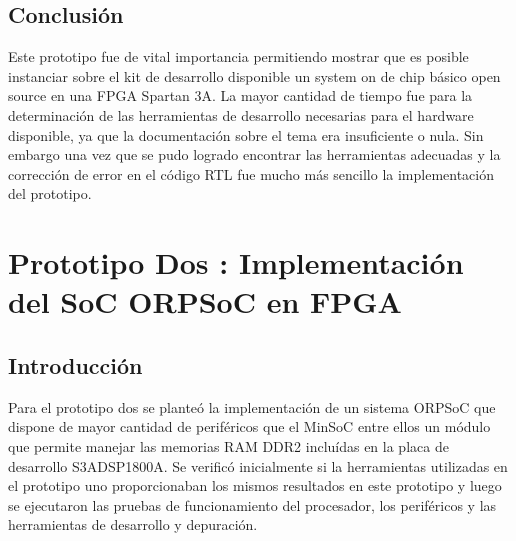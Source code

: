 		\section{Conclusión}
Este prototipo fue de vital importancia permitiendo mostrar que es posible instanciar sobre el kit de desarrollo disponible un system on de chip básico open source en una FPGA Spartan 3A.
La mayor cantidad de tiempo fue para la  determinación de las herramientas de desarrollo necesarias para el hardware disponible, ya que la documentación sobre el tema era insuficiente o nula. Sin embargo una vez que se pudo logrado encontrar las herramientas adecuadas y  la corrección de error en el código RTL fue mucho más sencillo la implementación del prototipo.
		
\newpage		
\chapter{Prototipo Dos : Implementación del SoC ORPSoC en FPGA}
		\section{Introducción}
		Para el prototipo dos se planteó la implementación de un sistema ORPSoC que dispone de mayor cantidad de periféricos que el MinSoC entre ellos un
		módulo que permite manejar las memorias RAM DDR2 incluídas en la placa de desarrollo S3ADSP1800A. Se verificó inicialmente si la herramientas
		utilizadas en el prototipo uno proporcionaban los mismos resultados en este prototipo y luego se ejecutaron las pruebas de funcionamiento del
		procesador, los periféricos y las herramientas de desarrollo y depuración. 
		
